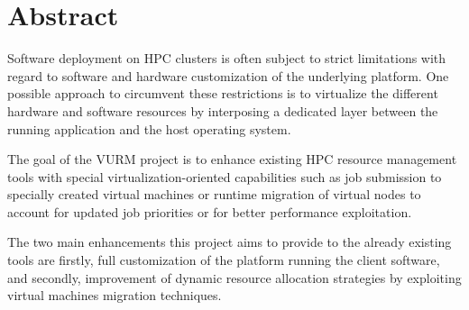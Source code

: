 \chapter*{\centering\Large Abstract}
\vspace{-20pt}

Software deployment on HPC clusters is often subject to strict limitations with regard to software and hardware customization of the underlying platform. One possible approach to circumvent these restrictions is to virtualize the different hardware and software resources by interposing a dedicated layer between the running application and the host operating system.

The goal of the VURM project is to enhance existing HPC resource management tools with special virtualization-oriented capabilities such as job submission to specially created virtual machines or runtime migration of virtual nodes to account for updated job priorities or for better performance exploitation.

The two main enhancements this project aims to provide to the already existing tools are firstly, full customization of the platform running the client software, and secondly, improvement of dynamic resource allocation strategies by exploiting virtual machines migration techniques.

